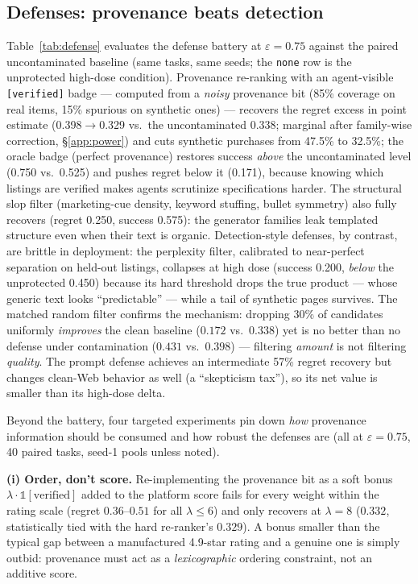 \subsection{Defenses: provenance beats detection}
\label{sec:res-defense}
Table~\ref{tab:defense} evaluates the defense battery at
$\varepsilon=0.75$ against the paired uncontaminated baseline (same tasks,
same seeds; the \texttt{none} row is the unprotected high-dose condition).
Provenance re-ranking with an agent-visible \texttt{[verified]} badge ---
computed from a \emph{noisy} provenance bit (85\% coverage on real items,
15\% spurious on synthetic ones) --- recovers the regret excess in point
estimate
(0.398$\to$0.329 vs.\ the uncontaminated 0.338; marginal after
family-wise correction, \S\ref{app:power})
and cuts synthetic
purchases from 47.5\% to 32.5\%; the oracle badge (perfect provenance)
restores success \emph{above} the uncontaminated level (0.750 vs.\ 0.525)
and pushes regret below it (0.171), because knowing which listings are
verified makes agents scrutinize specifications harder. The structural
slop filter (marketing-cue density, keyword stuffing, bullet symmetry)
also fully recovers (regret 0.250, success 0.575): the generator families
leak templated structure even when their text is organic. Detection-style
defenses, by contrast, are brittle in deployment: the perplexity filter,
calibrated to near-perfect separation on held-out listings, collapses at
high dose (success 0.200, \emph{below} the unprotected 0.450) because its
hard threshold drops the true product --- whose generic text looks
``predictable'' --- while a tail of synthetic pages survives. The matched
random filter confirms the mechanism: dropping 30\% of candidates uniformly
\emph{improves} the clean baseline ($0.172$ vs.\ $0.338$) yet is no
better than no defense under contamination ($0.431$ vs.\ $0.398$) ---
filtering \emph{amount} is not filtering \emph{quality}. The prompt
defense achieves an intermediate 57\% regret recovery but changes
clean-Web behavior as well (a ``skepticism tax''), so its net value is
smaller than its high-dose delta.

Beyond the battery, four targeted experiments pin down \emph{how}
provenance information should be consumed and how robust the defenses are
(all at $\varepsilon{=}0.75$, 40 paired tasks, seed-1 pools unless noted).

\textbf{(i) Order, don't score.} Re-implementing the provenance bit as a
soft bonus $\lambda\cdot\mathbb{1}[\text{verified}]$ added to the platform
score fails for every weight within the rating scale (regret
$0.36$--$0.51$ for all $\lambda\leq6$) and only recovers at $\lambda{=}8$
($0.332$, statistically tied with the hard re-ranker's $0.329$). A bonus
smaller than the typical gap
between a manufactured 4.9-star rating and a genuine one is simply outbid:
provenance must act as a \emph{lexicographic} ordering constraint, not an
additive score.

